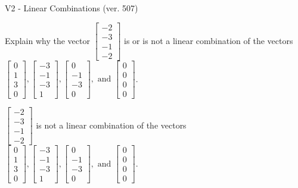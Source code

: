 \begin{exercise}
  \begin{exerciseTitle}V2 - Linear Combinations (ver. 507)\end{exerciseTitle}
  \begin{exerciseStatement}
    Explain why the vector \(\left[\begin{array}{c}
-2 \\
-3 \\
-1 \\
-2
\end{array}\right]\)  is or is not a linear 
	combination of the vectors \(\left[\begin{array}{c}
0 \\
1 \\
3 \\
0
\end{array}\right] , \left[\begin{array}{c}
-3 \\
-1 \\
-3 \\
1
\end{array}\right] , \left[\begin{array}{c}
0 \\
-1 \\
-3 \\
0
\end{array}\right] , \text{ and } \left[\begin{array}{c}
0 \\
0 \\
0 \\
0
\end{array}\right]\).
	


  \end{exerciseStatement}
  \begin{exerciseAnswer}
   \(\left[\begin{array}{c}
-2 \\
-3 \\
-1 \\
-2
\end{array}\right]\) 
  	 is not  
	a linear combination of the vectors \(\left[\begin{array}{c}
0 \\
1 \\
3 \\
0
\end{array}\right] , \left[\begin{array}{c}
-3 \\
-1 \\
-3 \\
1
\end{array}\right] , \left[\begin{array}{c}
0 \\
-1 \\
-3 \\
0
\end{array}\right] , \text{ and } \left[\begin{array}{c}
0 \\
0 \\
0 \\
0
\end{array}\right]\).


\end{exerciseAnswer}
\end{exercise}
